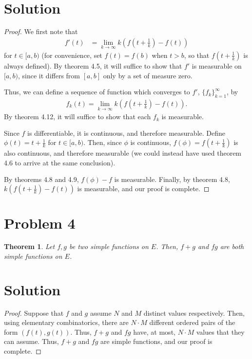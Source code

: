 \documentclass[10pt,a4paper]{article}
\theoremstyle{theorem}
\newtheorem{theorem}{Theorem}
\theoremstyle{definition}
\begin{document}
\section*{Solution}
\begin{proof}
We first note that 
\begin{align*}
f'(t) &= \lim_{k \to \infty} k \left( f(t + \frac{1}{k}) - f(t) \right)
\end{align*}
for $t \in [a, b)$ (for convenience, set $f(t) = f(b)$ when $t > b$, so that $f(t + \frac{1}{k})$ is always defined). By theorem 4.5,  it will suffice to show that $f'$ is measurable on $[a, b)$, since it differs from $[a, b]$ only by a set of measure zero.

Thus, we can define a sequence of function which converges to $f'$, $\{f_k \}_{k = 1}^\infty$, by
\begin{align*}
f_k(t) = \lim_{k \to \infty} k \left( f(t + \frac{1}{k}) - f(t) \right).
\end{align*}
By theorem 4.12, it will suffice to show that each $f_k$ is measurable.

Since $f$ is differentiable, it is continuous, and therefore measurable.  Define $\phi(t) = t + \frac{1}{k}$ for $t \in [a, b)$.  Then, since $\phi$ is continuous,  $f(\phi) = f(t + \frac{1}{k})$ is also continuous, and therefore measurable (we could instead have used theorem 4.6 to arrive at the same conclusion). 

By theorems 4.8 and 4.9, $f(\phi) - f$ is measurable. Finally, by theorem 4.8, $k \left( f(t + \frac{1}{k}) - f(t) \right)$ is measurable, and our proof is complete.
\end{proof}

\section*{Problem 4}
\begin{theorem}
Let $f, g$ be two simple functions on $E$. Then, $f +g$ and $fg$ are both simple functions on $E$.
\end{theorem}

\section*{Solution}
\begin{proof}
Suppose that $f$ and $g$ assume $N$ and $M$ distinct values respectively. Then, using elementary combinatorics, there are $N \cdot M$ different ordered pairs of the form $(f(t), g(t))$. Thus, $f + g$ and $fg$ have, at most, $N \cdot M$ values that they can assume. Thus, $f + g$ and $fg$ are simple functions, and our proof is complete.
\end{proof}
\end{document}
